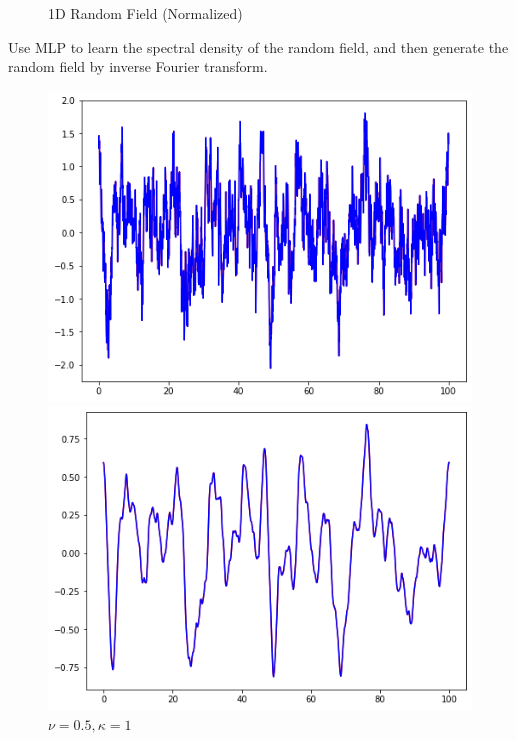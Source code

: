 \documentclass{article}
\begin{document}
\begin{figure}[H]
\begin{minipage}[t]{0.3\textwidth}
    \caption*{$\nu = 10, \kappa = 1$}
  \end{minipage}

    \caption{1D Random Field (Normalized)}
    \label{1drf}
\end{figure}

Use MLP to learn the spectral density of the random field, and then generate the random field by inverse Fourier transform.
\begin{figure}[H]
    \centering
\begin{minipage}[t]{0.3\textwidth}  %
    \centering
    \includegraphics[width=\textwidth]{./pics/1D_NeuralRF_4096_100.0_0.5_1.png}  %
    \caption*{$\nu = 0.5, \kappa = 1$}
  \end{minipage}
  \begin{minipage}[t]{0.3\textwidth} 
    \centering
    \includegraphics[width=\textwidth]{./pics/1D_NeuralRF_4096_100.0_2_1.png} 

\end{minipage}
\end{figure}
\end{document}
